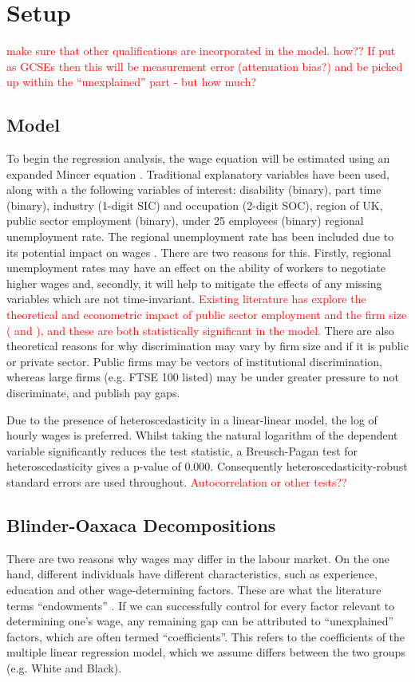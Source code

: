 \documentclass[class=article, crop=false]{standalone}
\begin{document}
\section{Setup}
\label{sec:Setup}
\textcolor{red}{make sure that other qualifications are incorporated in the model. how?? If put as GCSEs then this will be measurement error (attenuation bias?) and be picked up within the \enquote{unexplained} part - but how much?}
\subsection{Model}
\label{sec:Model}
To begin the regression analysis, the wage equation will be estimated using an expanded Mincer equation \citep{MincerA}. Traditional explanatory variables have been used, along with a the following variables of interest: disability (binary), part time (binary), industry (1-digit SIC) and occupation (2-digit SOC), region of UK, public sector employment (binary), under 25 employees (binary) regional unemployment rate. The regional unemployment rate has been included due to its potential impact on wages \citep{Bell}. There are two reasons for this. Firstly, regional unemployment rates may have an effect on the ability of workers to negotiate higher wages and, secondly, it will help to mitigate the effects of any missing variables which are not time-invariant. \textcolor{red}{Existing literature has explore the theoretical and econometric impact of public sector employment and the firm size (\citet{Longhi} and \citet{Longhi3}), and these are both statistically significant in the model.} There are also theoretical reasons for why discrimination may vary by firm size and if it is public or private sector. Public firms may be vectors of institutional discrimination, whereas large firms (e.g. FTSE 100 listed) may be under greater pressure to not discriminate, and publish pay gaps. %

Due to the presence of heteroscedasticity in a linear-linear model, the log of hourly wages is preferred. Whilst taking the natural logarithm of the dependent variable  significantly reduces the test statistic, a Breusch-Pagan test for heteroscedasticity gives a p-value of 0.000. Consequently heteroscedasticity-robust standard errors are used throughout. \textcolor{red}{Autocorrelation or other tests??}

\subsection{Blinder-Oaxaca Decompositions}
\label{sec:B_O_Decomp}
There are two reasons why wages may differ in the labour market. On the one hand, different individuals have different characteristics, such as experience, education and other wage-determining factors. These are what the literature terms \enquote{endowments} \citep{Blinder}. If we can successfully control for every factor relevant to determining one's wage, any remaining gap can be attributed to \enquote{unexplained} factors, which are often termed \enquote{coefficients}. This refers to the coefficients of the multiple linear regression model, which we assume differs between the two groups (e.g. White and Black). %
\end{document}

